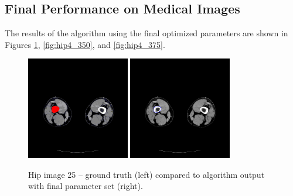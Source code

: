 \documentclass{article}
\begin{document}
		\subsection{Final Performance on Medical Images}
		The results of the algorithm using the final optimized parameters are shown in Figures \ref{fig:hip4_25}, \ref{fig:hip4_350}, and \ref{fig:hip4_375}. 
		\begin{figure}[H]
			\centering
			\includegraphics[width=0.4\textwidth]{Hip4/groundTruth25col.png}
			\hspace{20pt}
			\includegraphics[width=0.4\textwidth]{Hip4/output25.png}
			\caption{Hip image 25 -- ground truth (left) compared to algorithm output with final parameter set (right).}
			\label{fig:hip4_25}
		\end{figure}
\end{document}
